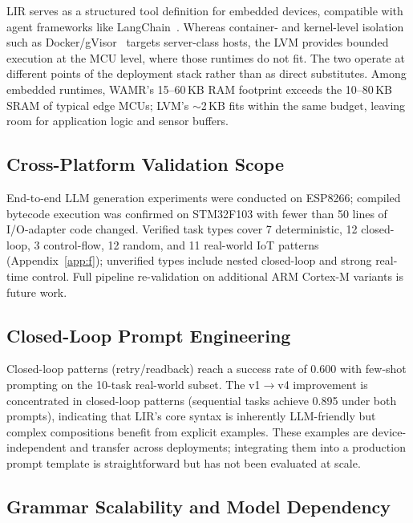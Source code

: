 \documentclass[a4paper,fleqn,longmktitle]{cas-dc}
\begin{document}
LIR serves as a structured tool definition for embedded devices, compatible with agent frameworks like LangChain~\citep{langchain}. Whereas container- and kernel-level isolation such as Docker/gVisor~\citep{gvisor} targets server-class hosts, the LVM provides bounded execution at the MCU level, where those runtimes do not fit. The two operate at different points of the deployment stack rather than as direct substitutes. Among embedded runtimes, WAMR's 15--60\,KB RAM footprint exceeds the 10--80\,KB SRAM of typical edge MCUs; LVM's $\sim$2\,KB fits within the same budget, leaving room for application logic and sensor buffers.

\subsection{Cross-Platform Validation Scope}
\label{sec:scope_platform}

End-to-end LLM generation experiments were conducted on ESP8266; compiled bytecode execution was confirmed on STM32F103 with fewer than 50 lines of I/O-adapter code changed. Verified task types cover 7 deterministic, 12 closed-loop, 3 control-flow, 12 random, and 11 real-world IoT patterns (Appendix~\ref{app:f}); unverified types include nested closed-loop and strong real-time control. Full pipeline re-validation on additional ARM Cortex-M variants is future work.

\subsection{Closed-Loop Prompt Engineering}
\label{sec:scope_closedloop}

Closed-loop patterns (retry/readback) reach a success rate of 0.600 with few-shot prompting on the 10-task real-world subset. The v1$\to$v4 improvement is concentrated in closed-loop patterns (sequential tasks achieve 0.895 under both prompts), indicating that LIR's core syntax is inherently LLM-friendly but complex compositions benefit from explicit examples. These examples are device-independent and transfer across deployments; integrating them into a production prompt template is straightforward but has not been evaluated at scale.

\subsection{Grammar Scalability and Model Dependency}
\label{sec:scope_grammar}
\end{document}
